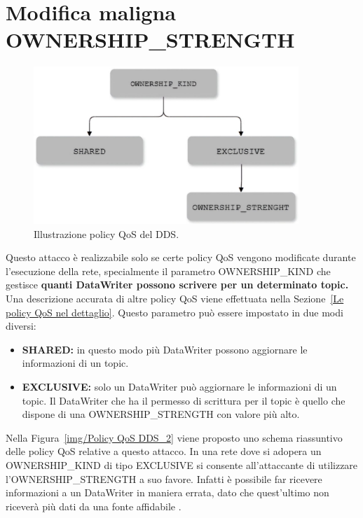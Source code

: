 \section{Modifica maligna OWNERSHIP\_STRENGTH}

\begin{figure}[H]
    \centering
    \includegraphics[width=10cm, keepaspectratio]{img/Policy QoS DDS_2.jpg}
    \caption{Illustrazione policy QoS del DDS.}\label{Mappa QoS}
\end{figure}
\label{img/Policy QoS DDS_2}


Questo attacco è realizzabile solo se certe policy QoS vengono
modificate durante l'esecuzione della rete, specialmente il parametro
OWNERSHIP\_KIND che gestisce \textbf{quanti DataWriter possono scrivere per un
determinato topic.} Una descrizione accurata di altre policy QoS viene 
effettuata nella Sezione~\ref{Le policy QoS nel dettaglio}.
Questo parametro può essere impostato in due modi diversi:
\begin{itemize}
    \item \textbf{SHARED:} in questo modo più DataWriter possono aggiornare le
    informazioni di un topic.
    \item \textbf{EXCLUSIVE:} solo un DataWriter può aggiornare le informazioni di un
    topic. Il DataWriter che ha il permesso di scrittura per il topic è quello
    che dispone di una OWNERSHIP\_STRENGTH con valore più alto.
\end{itemize}
Nella Figura~\ref{img/Policy QoS DDS_2} viene proposto uno schema riassuntivo
delle policy QoS relative a questo attacco.
In una rete dove si adopera un OWNERSHIP\_KIND di tipo EXCLUSIVE
si consente
all'attaccante di utilizzare l'OWNERSHIP\_STRENGTH a suo favore.
Infatti è possibile far ricevere informazioni a un DataWriter
in maniera errata, dato che quest'ultimo non riceverà più dati da
una fonte affidabile 
\cite{DBLP:conf/malware/MichaudDL18}.


